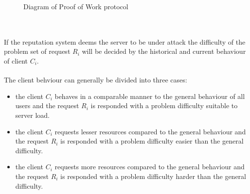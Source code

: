 \begin{figure}[H]
	\begin{center}
		\vspace{10pt}
		\caption{Diagram of Proof of Work protocol}\label{tab:protocol}
	\end{center}
\end{figure}
\\
\\
If the reputation system deems the server to be under attack the difficulty of the problem set of request $R_i$ will be decided by the historical and current behaviour of client $C_i$. 
\\
\\
The client behviour can generally be divided into three cases:
\begin{itemize}
\item the client $C_i$ behaves in a comparable manner to the general behaviour of all users and the request $R_i$ is responded with a problem difficulty suitable to server load.
\item the client $C_i$ requests lesser resources compared to the general behaviour and the request $R_i$ is responded with a problem difficulty easier than the general difficulty.
\item the client $C_i$ requests more resources compared to the general behaviour and the request $R_i$ is responded with a problem difficulty harder than the general difficulty.
\end{itemize}

